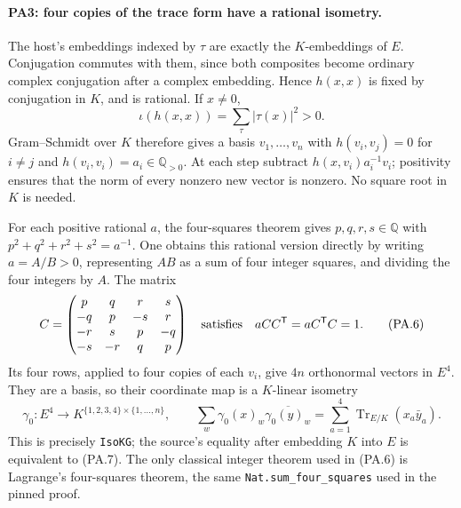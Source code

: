 \paragraph{PA3: four copies of the trace form have a rational isometry.}
The host's embeddings indexed by $\tau$ are exactly the $K$-embeddings
of $E$. Conjugation commutes with them, since both composites become
ordinary complex conjugation after a complex embedding. Hence
$h(x,x)$ is fixed by conjugation in $K$, and is rational. If $x\ne0$,
\[
 \iota(h(x,x))=\sum_\tau |\tau(x)|^2>0.                       \tag{PA.5}
\]
Gram--Schmidt over $K$ therefore gives a basis $v_1,\ldots,v_n$
with $h(v_i,v_j)=0$ for $i\ne j$ and
$h(v_i,v_i)=a_i\in\mathbb Q_{>0}$. At each step subtract
$h(x,v_i)a_i^{-1}v_i$; positivity ensures that the norm of every
nonzero new vector is nonzero. No square root in $K$ is needed.

For each positive rational $a$, the four-squares theorem gives
$p,q,r,s\in\mathbb Q$ with $p^2+q^2+r^2+s^2=a^{-1}$.
One obtains this rational version directly by writing $a=A/B>0$,
representing $AB$ as a sum of four integer squares, and dividing
the four integers by $A$. The matrix
\[
 C=\begin{pmatrix}
 p&q&r&s\\-q&p&-s&r\\-r&s&p&-q\\-s&-r&q&p
 \end{pmatrix}
 \quad\hbox{satisfies}\quad aCC^{\mathsf T}=aC^{\mathsf T}C=1.
                                                               \tag{PA.6}
\]
Its four rows, applied to four copies of each $v_i$, give $4n$
orthonormal vectors in $E^4$. They are a basis, so their coordinate
map is a $K$-linear isometry
\[
 \gamma_0:E^4\longrightarrow K^{\{1,2,3,4\}\times\{1,\ldots,n\}},
 \qquad
 \sum_w\gamma_0(x)_w\overline{\gamma_0(y)_w}
       =\sum_{a=1}^4\operatorname{Tr}_{E/K}(x_a\bar y_a).
                                                               \tag{PA.7}
\]
This is precisely \texttt{IsoKG}; the source's equality after
embedding $K$ into $E$ is equivalent to (PA.7). The only classical
integer theorem used in (PA.6) is Lagrange's four-squares theorem,
the same \texttt{Nat.sum\_four\_squares} used in the pinned proof.

